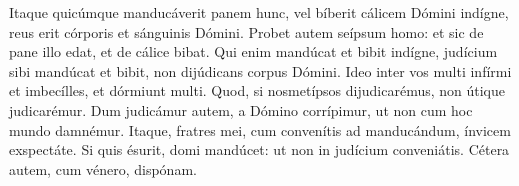 Itaque quicúmque manducáverit panem hunc, vel bíberit cálicem Dómini indígne,
	reus erit córporis et sánguinis Dómini.
Probet autem seípsum homo: et sic de pane illo edat, et de cálice bibat.
Qui enim mandúcat et bibit indígne,
	judícium sibi mandúcat et bibit, non dijúdicans corpus Dómini.
Ideo inter vos multi infírmi et imbecílles, et dórmiunt multi.
Quod, si nosmetípsos dijudicarémus, non útique judicarémur.
Dum judicámur autem, a Dómino corrípimur, ut non cum hoc mundo damnémur.
Itaque, fratres mei, cum convenítis ad manducándum, ínvicem exspectáte.
Si quis ésurit, domi mandúcet: ut non in judícium conveniátis.
Cétera autem, cum vénero, dispónam.
